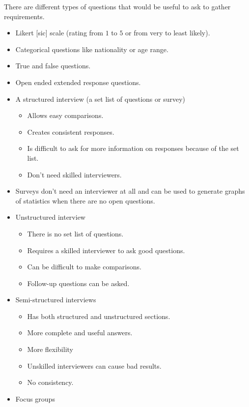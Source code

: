 \noindent
There are different types of questions that would be useful to ask to gather requirements.

\begin{itemize}
    \item Likert [sic] scale (rating from \(1\) to \(5\) or from very to least likely).
    \item Categorical questions like nationality or age range.
    \item True and false questions.
    \item Open ended extended response questions.
    \item A structured interview (a set list of questions or survey)

          \begin{itemize}
              \item Allows easy comparisons.
              \item Creates consistent responses.
              \item Is difficult to ask for more information on responses because of the set list.
              \item Don't need skilled interviewers.
          \end{itemize}
    \item Surveys don't need an interviewer at all and can be used to generate graphs of statistics when there are no open questions.
    \item Unstructured interview

          \begin{itemize}
              \item There is no set list of questions.
              \item Requires a skilled interviewer to ask good questions.
              \item Can be difficult to make comparisons.
              \item Follow-up questions can be asked.
          \end{itemize}
    \item Semi-structured interviews

          \begin{itemize}
              \item Has both structured and unstructured sections.
              \item More complete and useful answers.
              \item More flexibility
              \item Unskilled interviewers can cause bad results.
              \item No consistency.
          \end{itemize}
    \item Focus groups


\end{itemize}
